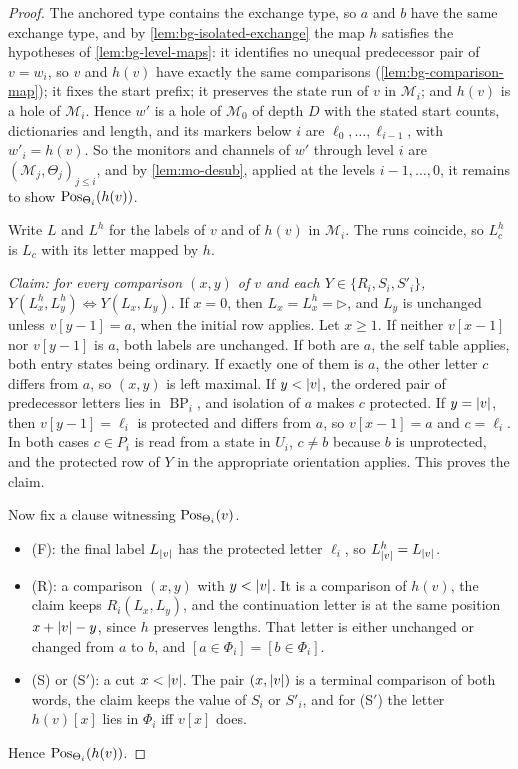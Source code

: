 \begin{proof}
The anchored type contains the exchange type, so $a$ and $b$ have the same
exchange type, and by \cref{lem:bg-isolated-exchange} the map $h$ satisfies the
hypotheses of \cref{lem:bg-level-maps}: it identifies no unequal predecessor
pair of $v=w_i$, so $v$ and $h(v)$ have exactly the same comparisons
(\cref{lem:bg-comparison-map}); it fixes the start prefix; it preserves the
state run of $v$ in $\mathcal M_i$; and $h(v)$ is a hole of $\mathcal M_i$.
Hence $w'$ is a hole of $\mathcal M_0$ of depth $D$ with the stated start
counts, dictionaries and length, and its markers below $i$ are
$\ell_0,\ldots,\ell_{i-1}$, with $w'_i=h(v)$. So the monitors and channels of
$w'$ through level $i$ are $(\mathcal M_j,\Theta_j)_{j\le i}$, and by
\cref{lem:mo-desub}, applied at the levels $i-1,\ldots,0$, it remains to show
$\operatorname{Pos}_{\Theta_i}(h(v))$.

Write $L$ and $L^h$ for the labels of $v$ and of $h(v)$ in $\mathcal M_i$. The
runs coincide, so $L^h_c$ is $L_c$ with its letter mapped by $h$.

\emph{Claim: for every comparison $(x,y)$ of $v$ and each
$Y\in\{R_i,S_i,S'_i\}$, $Y(L^h_x,L^h_y)\iff Y(L_x,L_y)$.} If $x=0$, then
$L_x=L^h_x=\triangleright$, and $L_y$ is unchanged unless $v[y-1]=a$, when the
initial row applies. Let $x\ge1$. If neither $v[x-1]$ nor $v[y-1]$ is $a$, both
labels are unchanged. If both are $a$, the self table applies, both entry
states being ordinary. If exactly one of them is $a$, the other letter $c$
differs from $a$, so $(x,y)$ is left maximal. If $y<\lvert v\rvert$, the ordered pair of
predecessor letters lies in $\operatorname{BP}_i$, and isolation of $a$ makes
$c$ protected. If $y=\lvert v\rvert$, then $v[y-1]=\ell_i$ is protected and differs
from $a$, so $v[x-1]=a$ and $c=\ell_i$. In both cases $c\in P_i$ is read from a
state in $U_i$, $c\ne b$ because $b$ is unprotected, and the protected row of
$Y$ in the appropriate orientation applies. This proves the claim.

Now fix a clause witnessing $\operatorname{Pos}_{\Theta_i}(v)$.
\begin{itemize}[leftmargin=*]
\item (F): the final label $L_{\lvert v\rvert}$ has the protected letter $\ell_i$, so
  $L^h_{\lvert v\rvert}=L_{\lvert v\rvert}$.
\item (R): a comparison $(x,y)$ with $y<\lvert v\rvert$. It is a comparison of $h(v)$,
  the claim keeps $R_i(L_x,L_y)$, and the continuation letter is at the same
  position $x+\lvert v\rvert-y$, since $h$ preserves lengths. That letter is either
  unchanged or changed from $a$ to $b$, and $[a\in\Phi_i]=[b\in\Phi_i]$.
\item (S) or (S$'$): a cut $x<\lvert v\rvert$. The pair $(x,\lvert v\rvert)$ is a terminal
  comparison of both words, the claim keeps the value of $S_i$ or $S'_i$, and
  for (S$'$) the letter $h(v)[x]$ lies in $\Phi_i$ iff $v[x]$ does.
\end{itemize}
Hence $\operatorname{Pos}_{\Theta_i}(h(v))$.
\end{proof}

